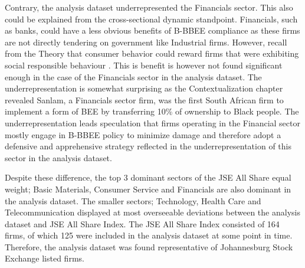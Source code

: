 Contrary, the analysis dataset underrepresented the Financials sector. This also could be explained from the cross-sectional dynamic standpoint. Financials, such as banks, could have a less obvious benefits of B-BBEE compliance as these firms are not directly tendering on government like Industrial firms. However, recall from the Theory that consumer behavior could reward firms that were exhibiting social responsible behaviour \cite[p378]{N34}. This is benefit is however not found significant enough in the case of the Financials sector in the analysis dataset. The underrepresentation is somewhat surprising as the Contextualization chapter revealed Sanlam, a Financials sector firm, was the first South African firm to implement a form of BEE by transferring 10\% of ownership to Black people. The underrepresentation leads speculation that firms operating in the Financial sector mostly engage in B-BBEE policy to minimize damage and therefore adopt a defensive and apprehensive strategy reflected in the underrepresentation of this sector in the analysis dataset.

Despite these difference, the top 3 dominant sectors of the JSE All Share equal weight; Basic Materials, Consumer Service and Financials are also dominant in the analysis dataset. The smaller sectors; Technology, Health Care and Telecommunication displayed at most overseeable deviations between the analysis dataset and JSE All Share Index. The JSE All Share Index consisted of 164 firms, of which 125 were included in the analysis dataset at some point in time. Therefore, the analysis dataset was found representative of Johannesburg Stock Exchange listed firms.

